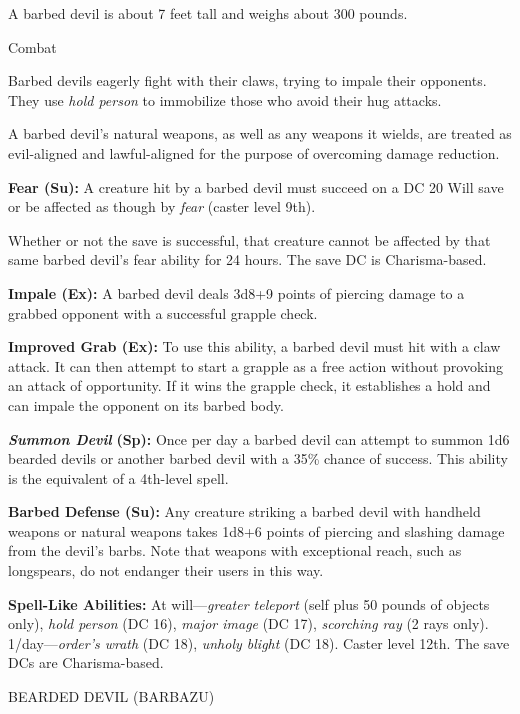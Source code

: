\documentclass{article}
\begin{document}
A barbed devil is about 7 feet tall and weighs about 300 pounds.

Combat

Barbed devils eagerly fight with their claws, trying to impale their opponents. 
They use \textit{hold person }to immobilize those who avoid their hug attacks.

A barbed devil's natural weapons, as well as any weapons it wields, are treated 
as evil-aligned and lawful-aligned for the purpose of overcoming damage reduction.

\textbf{Fear (Su):} A creature hit by a barbed devil must succeed on a DC 20 Will 
save or be affected as though by \textit{fear }(caster level 9th). 

Whether or not the save is successful, that creature cannot be affected by that 
same barbed devil's fear ability for 24 hours. The save DC is Charisma-based.

\textbf{Impale (Ex):} A barbed devil deals 3d8+9 points of piercing damage to a 
grabbed opponent with a successful grapple check. 

\textbf{Improved Grab (Ex):} To use this ability, a barbed devil must hit with 
a claw attack. It can then attempt to start a grapple as a free action without 
provoking an attack of opportunity. If it wins the grapple check, it establishes 
a hold and can impale the opponent on its barbed body.

\textit{\textbf{Summon Devil }}\textbf{(Sp):} Once per day a barbed devil can attempt 
to summon 1d6 bearded devils or another barbed devil with a 35\% chance of success. 
This ability is the equivalent of a 4th-level spell.

\textbf{Barbed Defense (Su):} Any creature striking a barbed devil with handheld 
weapons or natural weapons takes 1d8+6 points of piercing and slashing damage from 
the devil's barbs. Note that weapons with exceptional reach, such as longspears, 
do not endanger their users in this way.

\textbf{Spell-Like Abilities:} At will---\textit{greater teleport }(self plus 50 
pounds of objects only), \textit{hold person }(DC 16), \textit{major image }(DC 
17), \textit{scorching ray }(2 rays only). 1/day---\textit{order's wrath }(DC 18), 
\textit{unholy blight }(DC 18). Caster level 12th. The save DCs are Charisma-based.

\vspace{12pt}
BEARDED DEVIL (BARBAZU)
\end{document}
